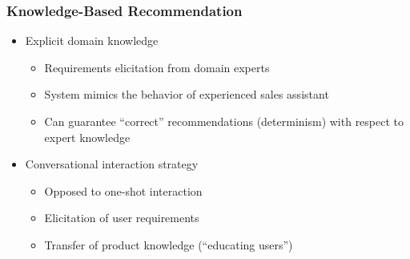 \documentclass{beamer}
\begin{document}
\begin{frame}
    \frametitle{Knowledge-Based Recommendation}
    \begin{itemize}
    \item Explicit domain knowledge
        \begin{itemize}
        \item Requirements elicitation from domain experts
        \item System mimics the behavior of experienced sales assistant
        \item Can guarantee ``correct'' recommendations (determinism) with
            respect to expert knowledge
        \end{itemize}
    \item Conversational interaction strategy
        \begin{itemize}
        \item Opposed to one-shot interaction
        \item Elicitation of user requirements
        \item Transfer of product knowledge (``educating users'')
        \end{itemize}
    \end{itemize}
\end{frame}
\end{document}
